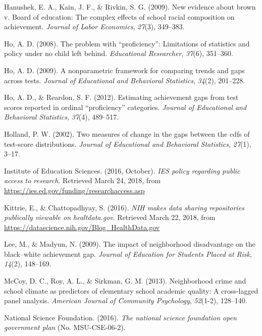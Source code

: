 \documentclass[man, fleqn, noextraspace]{apa6}
\theoremstyle{definition}
\theoremstyle{definition}
\theoremstyle{definition}
\theoremstyle{remark}
\begin{document}
\leavevmode\hypertarget{ref-hanushek09}{}%
Hanushek, E. A., Kain, J. F., \& Rivkin, S. G. (2009). New evidence
about brown v. Board of education: The complex effects of school racial
composition on achievement. \emph{Journal of Labor Economics},
\emph{27}(3), 349--383.

\leavevmode\hypertarget{ref-ho08}{}%
Ho, A. D. (2008). The problem with ``proficiency'': Limitations of
statistics and policy under no child left behind. \emph{Educational
Researcher}, \emph{37}(6), 351--360.

\leavevmode\hypertarget{ref-ho09}{}%
Ho, A. D. (2009). A nonparametric framework for comparing trends and
gaps across tests. \emph{Journal of Educational and Behavioral
Statistics}, \emph{34}(2), 201--228.

\leavevmode\hypertarget{ref-ho12}{}%
Ho, A. D., \& Reardon, S. F. (2012). Estimating achievement gaps from
test scores reported in ordinal ``proficiency'' categories.
\emph{Journal of Educational and Behavioral Statistics}, \emph{37}(4),
489--517.

\leavevmode\hypertarget{ref-holland02}{}%
Holland, P. W. (2002). Two measures of change in the gaps between the
cdfs of test-score distributions. \emph{Journal of Educational and
Behavioral Statistics}, \emph{27}(1), 3--17.

\leavevmode\hypertarget{ref-ies16}{}%
Institute of Education Sciences. (2016, October). \emph{IES policy
regarding public access to research}. Retrieved March 24, 2018, from
\url{https://ies.ed.gov/funding/researchaccess.asp}

\leavevmode\hypertarget{ref-nih_16}{}%
Kittrie, E., \& Chattopadhyay, S. (2016). \emph{NIH makes data sharing
repositories publically viewable on healtdata.gov}. Retrieved March 22,
2018, from \url{https://datascience.nih.gov/Blog_HealthData.gov}

\leavevmode\hypertarget{ref-lee09}{}%
Lee, M., \& Madyun, N. (2009). The impact of neighborhood disadvantage
on the black--white achievement gap. \emph{Journal of Education for
Students Placed at Risk}, \emph{14}(2), 148--169.

\leavevmode\hypertarget{ref-mccoy13}{}%
McCoy, D. C., Roy, A. L., \& Sirkman, G. M. (2013). Neighborhood crime
and school climate as predictors of elementary school academic quality:
A cross-lagged panel analysis. \emph{American Journal of Community
Psychology}, \emph{52}(1-2), 128--140.

\leavevmode\hypertarget{ref-nsf16}{}%
National Science Foundation. (2016). \emph{The national science
foundation open government plan} (No. MSU-CSE-06-2).
\end{document}
